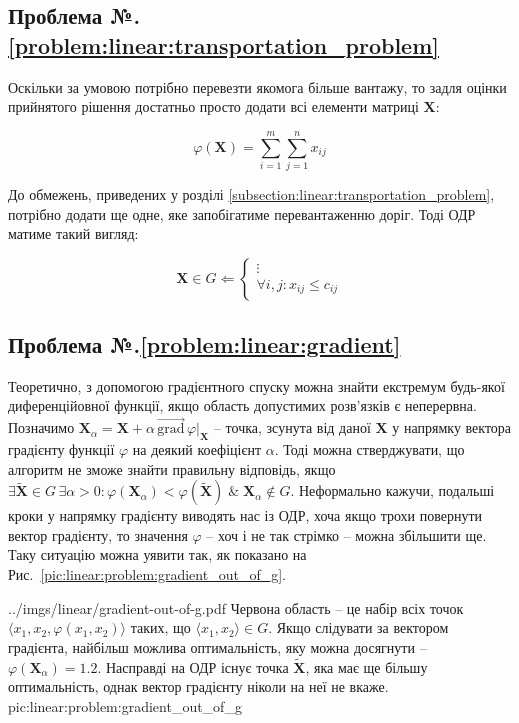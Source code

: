 \documentclass[\main/book.tex]{subfiles}
\begin{document}
\subsection*{Проблема №.\ref{problem:linear:transportation_problem}}

Оскільки за умовою потрібно \flqq{}перевезти якомога більше вантажу\frqq{}, то задля оцінки прийнятого рішення достатньо просто додати всі елементи матриці $\mathbf{X}$:

\[
 \varphi(\mathbf{X}) = \sum_{i=1}^{m} \sum_{j=1}^{n} x_{ij}
\]

До обмежень, приведених у розділі \ref{subsection:linear:transportation_problem}, потрібно додати ще одне, яке запобігатиме перевантаженню доріг. Тоді ОДР матиме такий вигляд:

\[
 \mathbf{X} \in G \Leftarrow \left\{
  \begin{array}{l}
   \vdots \\
   \forall i, j: x_{ij} \leq c_{ij}
  \end{array}
 \right.
\]

\subsection*{Проблема №.\ref{problem:linear:gradient}}

Теоретично, з допомогою градієнтного спуску можна знайти екстремум будь-якої диференційовної функції, якщо область допустимих розв'язків є неперервна. Позначимо $\mathbf{X}_\alpha = \mathbf{X} + \alpha \, \overrightarrow{\textrm{grad}} \, \varphi \Bigr|_\mathbf{X}$ -- точка, зсунута від даної $\mathbf{X}$ у напрямку вектора градієнту функції $\varphi$ на деякий коефіцієнт $\alpha$. Тоді можна стверджувати, що алгоритм не зможе знайти правильну відповідь, якщо $\exists \widetilde{\mathbf{X}} \in G \, \exists \alpha > 0: \varphi(\mathbf{X}_\alpha) < \varphi(\widetilde{\mathbf{X}}) \;\&\; \mathbf{X}_\alpha \notin G$. Неформально кажучи, подальші кроки у напрямку градієнту виводять нас із ОДР, хоча якщо трохи повернути вектор градієнту, то значення $\varphi$ -- хоч і не так стрімко -- можна збільшити ще. Таку ситуацію можна уявити так, як показано на Рис.~\ref{pic:linear:problem:gradient_out_of_g}.

\illustration
 {../imgs/linear/gradient-out-of-g.pdf}
 {Червона область -- це набір всіх точок $\langle x_1, x_2, \varphi(x_1, x_2)\rangle$ таких, що $\langle x_1, x_2 \rangle \in G$. Якщо слідувати за вектором градієнта, найбільш можлива оптимальність, яку можна досягнути -- $\varphi(\mathbf{X}_\alpha)=1.2$. Насправді на ОДР існує точка $\widetilde{\mathbf{X}}$, яка має ще більшу оптимальність, однак вектор градієнту ніколи на неї не вкаже.}
 {pic:linear:problem:gradient_out_of_g}
\end{document}
